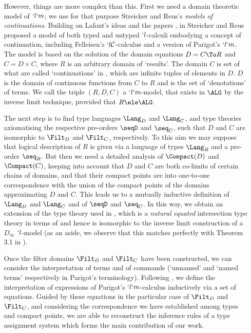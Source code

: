\documentclass{CSML}
\begin{document}
However, things are %
more complex than this. 
First we need a domain theoretic model of $`l`m$; we use for that purpose Streicher and Reus's \emph{models of continuations}. 
Building on Lafont's ideas and the papers \cite{Lafont-Reus-Streicher'93,Ong-Stewart'97}, in \cite{Streicher-Reus'98} Streicher and Reus proposed a model of both typed and untyped $`l$-calculi embodying a concept of continuation, including Felleisen's $`l{\mathcal C}$-calculus \cite{Felleisen-Friedman-Kohlbecker'86,Felleisen-PhD'87} and a version of Parigot's $`l`m$.
The model is based on the solution of the domain equations $D = C\To R$ and $C = D \times C$, where $R$ is an arbitrary domain of `results'. 
The domain $C$ is set of what are called `continuations' in \cite{Streicher-Reus'98}, which are infinite tuples of elements in $D$. 
$D$ is the domain of continuous functions from $C$ to $R$ and is the set of `denotations' of terms. 
We call the triple $(R,D,C)$ a $`l`m$-model, that exists in $\ALG$ by the inverse limit technique, provided that $R\ele \ALG$. 

The next step is to find type languages $\Lang_D$ and $\Lang_C$, and type theories axiomatising the respective pre-orders $\seqD$ and $\seq_C$, such that $D$ and $C$ are isomorphic to $\Filt_D$ and $\Filt_C$, respectively. 
To this aim we may suppose that logical description of $R$ is given via a language of types $\Lang_R$ and a pre-order $\seq_R$.
But then we need a detailed analysis of $\Compact(D)$ and $\Compact(C)$, keeping into account that $D$ and $C$ are both co-limits of certain chains of domains, and that their compact points are into one-to-one correspondence with the union of the compact points of the domains approximating $D$ and $C$.
This leads us to a mutually inductive definition of $\Lang_D$ and $\Lang_C$ and of $\seqD$ and $\seq_C$.
In this way, we obtain an extension of the type theory used in \cite{BCD'83}, which is a \emph{natural equated} intersection type theory in terms of \cite{Alessi-Severi'08} and hence is isomorphic to the inverse limit construction of a $D_ \infty$ $`l$-model (as an aside, we observe that this matches perfectly with Theorem 3.1 in \cite{Streicher-Reus'98}).

Once the filter domains $\Filt_D$ and $\Filt_C$ have been constructed, we can consider the interpretation of terms and of commands (`unnamed' and `named terms' respectively in Parigot's terminology). 
Following \cite{Streicher-Reus'98}, we define the interpretation of expressions of Parigot's $`l`m$-calculus inductively via a set of equations.
Guided by these equations in the particular case of $\Filt_D$ and $\Filt_C$, and considering the correspondence we have established among types and compact points, we are able to reconstruct the inference rules of a type assignment system which forms the main contribution of our work.
\end{document}
